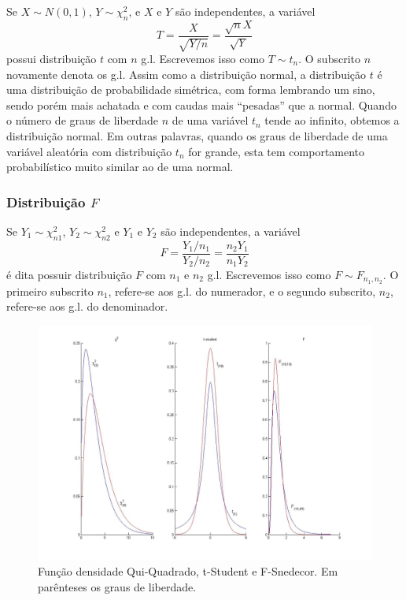 \documentclass[
]{book}
\theoremstyle{definition}
\theoremstyle{definition}
\theoremstyle{definition}
\theoremstyle{remark}
\begin{document}
Se \(X \sim N(0,1)\), \(Y \sim \chi^2_n\), e \(X\) e \(Y\) são independentes, a variável
\[T=\frac{X}{\sqrt{Y/n}}=\frac{\sqrt{n}X}{\sqrt{Y}}\]
possui distribuição \(t\) com \(n\) g.l. Escrevemos isso como \(T \sim t_n\). O subscrito \(n\) novamente
denota os g.l. Assim como a distribuição normal, a distribuição \(t\) é uma distribuição de probabilidade simétrica, com forma lembrando um sino, sendo porém mais achatada e com caudas mais ``pesadas'' que a normal. Quando o número de graus de liberdade \(n\) de uma variável \(t_n\) tende ao infinito, obtemos a distribuição normal. Em outras palavras, quando os graus de liberdade de uma variável aleatória com distribuição \(t_n\) for grande, esta tem comportamento probabilístico muito similar ao de uma normal.

\hypertarget{distribuiuxe7uxe3o-f}{%
\subsubsection{\texorpdfstring{Distribuição \(F\)}{Distribuição F}}\label{distribuiuxe7uxe3o-f}}

Se \(Y_1 \sim \chi^2_{n1}\), \(Y_2 \sim \chi^2_{n2}\) e \(Y_1\) e \(Y_2\) são independentes, a variável
\[F=\frac{Y_1/n_1}{Y_2/n_2}=\frac{n_2Y_1}{n_1Y_2}\]
é dita possuir distribuição \(F\) com \(n_1\) e \(n_2\) g.l. Escrevemos isso como \(F\sim F_{n_1,n_2}\). O primeiro subscrito \(n_1\), refere-se aos g.l. do numerador, e o segundo subscrito, \(n_2\), refere-se aos g.l. do denominador.

\begin{figure}

{\centering \includegraphics[width=0.8\linewidth]{Figuras/chi_t_F_density} 

}

\caption{Função densidade Qui-Quadrado, t-Student e F-Snedecor. Em parênteses os graus de liberdade.}\label{fig:len}
\end{figure}
\end{document}
